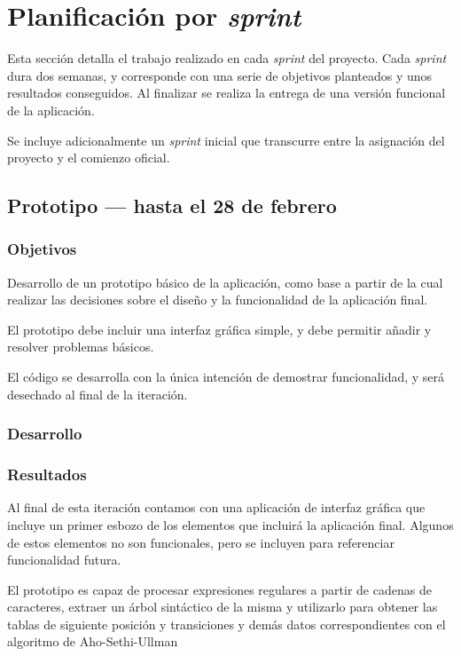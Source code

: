 
\section{Planificación por \emph{sprint}}
Esta sección detalla el trabajo realizado en cada \emph{sprint} del proyecto. Cada \emph{sprint} dura dos semanas, y corresponde con una serie de objetivos planteados y unos resultados conseguidos.
Al finalizar se realiza la entrega de una versión funcional de la aplicación.

Se incluye adicionalmente un \emph{sprint} inicial que transcurre entre la asignación del proyecto y el comienzo oficial.

\subsection{Prototipo --- hasta el 28 de febrero}

\subsubsection{Objetivos}
Desarrollo de un prototipo básico de la aplicación, como base a partir de la cual realizar las decisiones sobre el diseño y la funcionalidad de la aplicación final.

El prototipo debe incluir una interfaz gráfica simple, y debe permitir añadir y resolver problemas básicos.

El código se desarrolla con la única intención de demostrar funcionalidad, y será desechado al final de la iteración.

\subsubsection{Desarrollo}

\subsubsection{Resultados}
Al final de esta iteración contamos con una aplicación de interfaz gráfica que incluye un primer esbozo de los elementos que incluirá la aplicación final.
Algunos de estos elementos no son funcionales, pero se incluyen para referenciar funcionalidad futura.

El prototipo es capaz de procesar expresiones regulares a partir de cadenas de caracteres, extraer un árbol sintáctico de la misma y utilizarlo para obtener las tablas de siguiente posición y transiciones y demás datos correspondientes con el algoritmo de Aho-Sethi-Ullman

